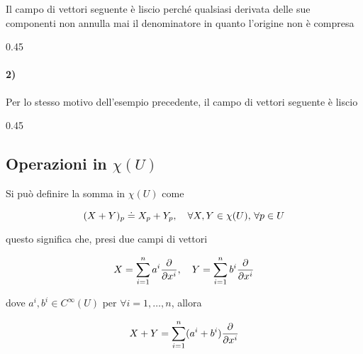 Il campo di vettori seguente è liscio perché qualsiasi derivata delle sue componenti non annulla mai il denominatore in quanto l'origine non è compresa

	{0.45}{%
		}

\paragraph{2)}

Per lo stesso motivo dell'esempio precedente, il campo di vettori seguente è liscio

	{0.45}{%
	}

\subsection{Operazioni in $ \chi(U) $}

Si può definire la somma in $ \chi(U) $ come

\begin{equation}
	(X+Y)_{p} \doteq X_{p} + Y_{p} \qcomma \forall X,Y \in \chi(U), \, \forall p \in U
\end{equation}

questo significa che, presi due campi di vettori

\begin{equation}
	X = \sum_{i=1}^{n} a^{i} \pdv{x^{i}} \qcomma Y = \sum_{i=1}^{n} b^{i} \pdv{x^{i}}
\end{equation}

dove $ a^{i},b^{i} \in C^{\infty}(U) $ per $ \forall i = 1, \dots, n $, allora

\begin{equation}
	X + Y = \sum_{i=1}^{n} (a^{i}+b^{i}) \pdv{x^{i}}
\end{equation}

